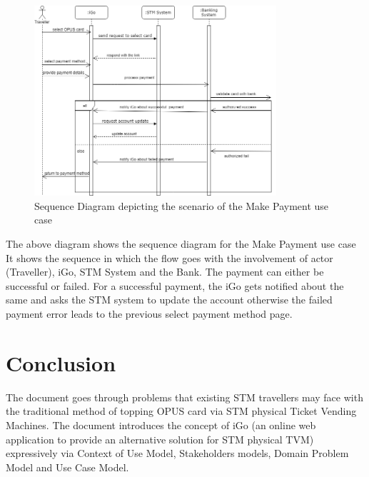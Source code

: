 \documentclass[11pt, english]{article}
\begin{document}
 \begin{figure}[H]
  
  \includegraphics[width=0.8\textwidth]{seqfinal1.png}
  \centering
  \caption{Sequence Diagram depicting the scenario of the Make Payment use case}

\end{figure}

The above diagram shows the sequence diagram for the Make Payment use case 
It shows the sequence in which the flow goes with the involvement of actor (Traveller), iGo, STM System and the Bank. The payment can either be successful or failed. For a successful payment, the iGo gets notified about the same and asks the STM  system to update the account otherwise the failed payment error leads to the previous select payment method page. 

\section{Conclusion}
The document goes through problems that existing STM travellers may face with the traditional method of topping OPUS card via STM physical Ticket Vending Machines. The document introduces the concept of iGo (an online web application to provide an alternative solution for STM physical TVM) expressively via Context of Use Model, Stakeholders models, Domain Problem Model and Use Case Model. 


\printbibliography

\printglossary
\end{document}
